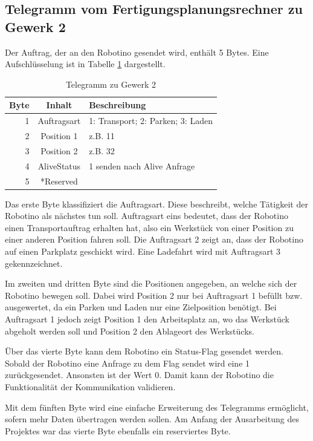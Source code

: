\subsection{Telegramm vom Fertigungsplanungsrechner zu Gewerk 2}

Der Auftrag, der an den Robotino gesendet wird, enthält 5 Bytes. Eine Aufschlüsselung ist in Tabelle \ref{tab:TelegrammZuG2} dargestellt. 

\begin{table}[!ht]
	\centering
	\begin{tabular}{|r|c|l|}
		\hline
		Byte & Inhalt	&	Beschreibung \\
		\hline
			1  & Auftragsart & 1: Transport; 2: Parken; 3: Laden  \\
			2  & Position 1  & z.B. 11 \\
			3  & Position 2  & z.B. 32 \\
		  4  & AliveStatus & 1 senden nach Alive Anfrage \\
		  5  & *Reserved   &  \\
		\hline
	\end{tabular}
	\caption{Telegramm zu Gewerk 2}
	\label{tab:TelegrammZuG2}
\end{table}

Das erste Byte klassifiziert die Auftragsart. Diese beschreibt, welche Tätigkeit der Robotino als nächstes tun soll. Auftragsart eins bedeutet, dass der Robotino einen Transportauftrag erhalten hat, also ein Werkstück von einer Position zu einer anderen \Gls{Position} fahren soll. Die Auftragsart 2 zeigt an, dass der Robotino auf einen Parkplatz geschickt wird. Eine Ladefahrt wird mit Auftragsart 3 gekennzeichnet. 

Im zweiten und dritten Byte sind die Positionen angegeben, an welche sich der Robotino bewegen soll. Dabei wird Position 2 nur bei Auftragsart 1 befüllt bzw. ausgewertet, da ein Parken und Laden nur eine Zielposition benötigt. Bei Auftragsart 1 jedoch zeigt Position 1 den Arbeitsplatz an, wo das Werkstück abgeholt werden soll und Position 2 den Ablageort des Werkstücks. 

Über das vierte Byte kann dem Robotino ein Status-Flag gesendet werden. Sobald der Robotino eine Anfrage zu dem Flag sendet wird eine 1 zurückgesendet. Ansonsten ist der Wert 0. Damit kann der Robotino die Funktionalität der Kommunikation validieren.

Mit dem fünften Byte wird eine einfache Erweiterung des Telegramms ermöglicht, sofern mehr Daten übertragen werden sollen. Am Anfang der Ausarbeitung des Projektes war das vierte Byte ebenfalls ein reserviertes Byte. 

